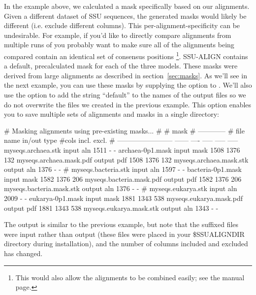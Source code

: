 In the  example above, we calculated a mask
specifically based on our  alignments. Given a different
dataset of SSU sequences, the generated masks would likely be
different (i.e. exclude different columns). This
per-alignment-specificity can be undesirable. For example, if you'd
like to directly compare alignments from multiple runs of
 you probably want to make sure all of the
alignments being compared contain an identical set of consensus
positions \footnote{This would also allow the alignments to be combined
easily; see the  manual page.}. SSU-ALIGN
contains a default, precalculated mask for each of the three
models. These masks were derived from large alignments as
described in section~\ref{sec:masks}. As we'll see in the next example, you
can use these masks by supplying the  option to
. We'll also use the  option to add the
string ``default'' to the names of the output files so we do not
overwrite the files we created in the previous example. This option
enables you to save multiple sets of alignments and masks in a single
directory:


\begin{sreoutput}
# Masking alignments using pre-existing masks...
#
#                                                    mask    
#                                                ------------
# file name                 in/out  type  #cols  incl.  excl.
# ------------------------  ------  ----  -----  -----  -----
  myseqs.archaea.stk         input   aln   1511      -      -
  archaea-0p1.mask           input  mask   1508   1376    132
  myseqs.archaea.mask.pdf   output   pdf   1508   1376    132
  myseqs.archaea.mask.stk   output   aln   1376      -      -
#
  myseqs.bacteria.stk        input   aln   1597      -      -
  bacteria-0p1.mask          input  mask   1582   1376    206
  myseqs.bacteria.mask.pdf  output   pdf   1582   1376    206
  myseqs.bacteria.mask.stk  output   aln   1376      -      -
#
  myseqs.eukarya.stk         input   aln   2009      -      -
  eukarya-0p1.mask           input  mask   1881   1343    538
  myseqs.eukarya.mask.pdf   output   pdf   1881   1343    538
  myseqs.eukarya.mask.stk   output   aln   1343      -      -
\end{sreoutput}

The output is similar to the previous example, but note that the
 suffixed files were input rather than output (these files
were placed in your \$SSUALIGNDIR directory during installation), and the number
of columns included and excluded has changed.

